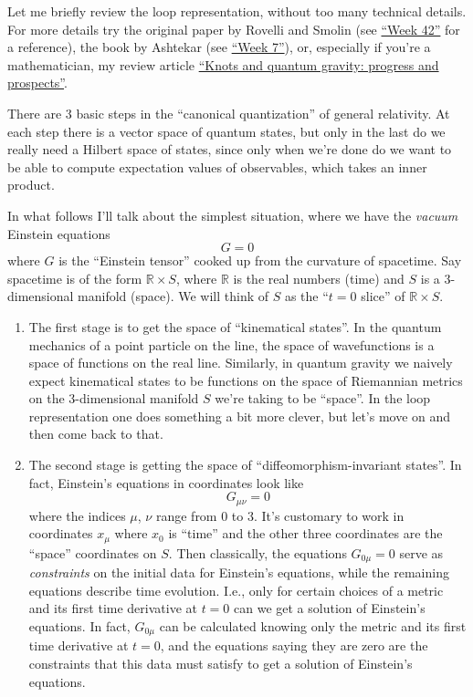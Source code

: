 \documentclass{article}
\begin{document}
Let me briefly review the loop representation, without too many
technical details. For more details try the original paper by Rovelli
and Smolin (see \protect\hyperlink{week42}{``Week 42''} for a
reference), the book by Ashtekar (see \protect\hyperlink{week7}{``Week
7''}), or, especially if you're a mathematician, my review article
\href{http://math.ucr.edu/home/baez/knot.ps}{``Knots and quantum
gravity: progress and prospects''}.

There are 3 basic steps in the ``canonical quantization'' of general
relativity. At each step there is a vector space of quantum states, but
only in the last do we really need a Hilbert space of states, since only
when we're done do we want to be able to compute expectation values of
observables, which takes an inner product.

In what follows I'll talk about the simplest situation, where we have
the \emph{vacuum} Einstein equations \[G = 0\] where \(G\) is the
``Einstein tensor'' cooked up from the curvature of spacetime. Say
spacetime is of the form \(\mathbb{R} \times S\), where \(\mathbb{R}\)
is the real numbers (time) and \(S\) is a 3-dimensional manifold
(space). We will think of \(S\) as the ``\(t = 0\) slice'' of
\(\mathbb{R} \times S\).

\begin{enumerate}
\def\labelenumi{\Roman{enumi})}
\item
  The first stage is to get the space of ``kinematical states''. In the
  quantum mechanics of a point particle on the line, the space of
  wavefunctions is a space of functions on the real line. Similarly, in
  quantum gravity we naively expect kinematical states to be functions
  on the space of Riemannian metrics on the 3-dimensional manifold \(S\)
  we're taking to be ``space''. In the loop representation one does
  something a bit more clever, but let's move on and then come back to
  that.
\item
  The second stage is getting the space of ``diffeomorphism-invariant
  states''. In fact, Einstein's equations in coordinates look like
  \[G_{\mu \nu} = 0\] where the indices \(\mu\), \(\nu\) range from 0 to
  3. It's customary to work in coordinates \(x_{\mu}\) where \(x_0\) is
  ``time'' and the other three coordinates are the ``space'' coordinates
  on \(S\). Then classically, the equations \(G_{0 \mu} = 0\) serve as
  \emph{constraints} on the initial data for Einstein's equations, while
  the remaining equations describe time evolution. I.e., only for
  certain choices of a metric and its first time derivative at \(t = 0\)
  can we get a solution of Einstein's equations. In fact, \(G_{0 \mu}\)
  can be calculated knowing only the metric and its first time
  derivative at \(t = 0\), and the equations saying they are zero are
  the constraints that this data must satisfy to get a solution of
  Einstein's equations.
\end{enumerate}
\end{document}

